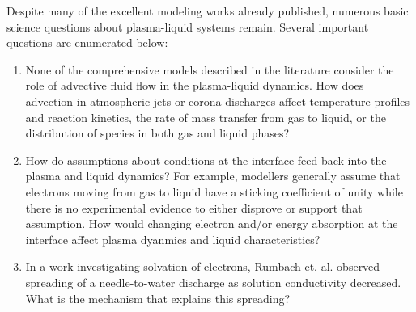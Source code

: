 Despite many of the excellent modeling works already published, numerous basic science questions about plasma-liquid systems remain. Several important questions are enumerated below:

\begin{enumerate}
\item \label{itm:advection} None of the comprehensive models described in the literature consider the role of advective fluid flow in the plasma-liquid dynamics. How does advection in atmospheric jets or corona discharges affect temperature profiles and reaction kinetics, the rate of mass transfer from gas to liquid, or the distribution of species in both gas and liquid phases?
\item \label{itm:interface} How do assumptions about conditions at the interface feed back into the plasma and liquid dynamics? For example, modellers \cite{Tian2014,shirafuji2014numerical} generally assume that electrons moving from gas to liquid have a sticking coefficient of unity while there is no experimental evidence to either disprove or support that assumption. How would changing electron and/or energy absorption at the interface affect plasma dyanmics and liquid characteristics?
\item \label{itm:spreading} In a work investigating solvation of electrons, Rumbach et. al. \cite{rumbach2015solvation} observed spreading of a needle-to-water discharge as solution conductivity decreased. What is the mechanism that explains this spreading?
\end{enumerate}

